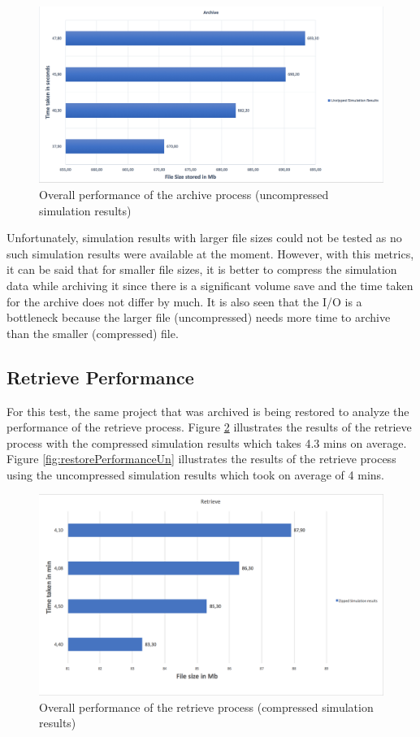 \begin{figure}[H]
    \centering \includegraphics[scale=0.45]{grafiken/archiveUnzip.png}
    \caption{Overall performance of the archive process (uncompressed simulation results)}
    \label{fig:archivePerformanceUn}
\end{figure}

Unfortunately, simulation results with larger file sizes could not be tested as no such simulation results were available at the moment. However, with this metrics, it can be said that
for smaller file sizes, it is better to compress the simulation data while archiving it since there is a significant volume save and the time taken for the
archive does not differ by much. It is also seen that the I/O is a bottleneck because the larger file (uncompressed) needs more time to archive than the smaller (compressed) file. 

\subsection{Retrieve Performance}
For this test, the same project that was archived is being restored to analyze the performance of the retrieve process. Figure \ref{fig:restorePerformance} illustrates
the results of the retrieve process with the compressed simulation results which takes 4.3 mins on average. Figure \ref{fig:restorePerformanceUn} illustrates the
results of the retrieve process using the uncompressed simulation results which took on average of 4 mins. 

\begin{figure}[H]
    \centering \includegraphics[scale=0.5]{grafiken/retrieveZip.png}
    \caption{Overall performance of the retrieve process (compressed simulation results)}
    \label{fig:restorePerformance}
\end{figure}

